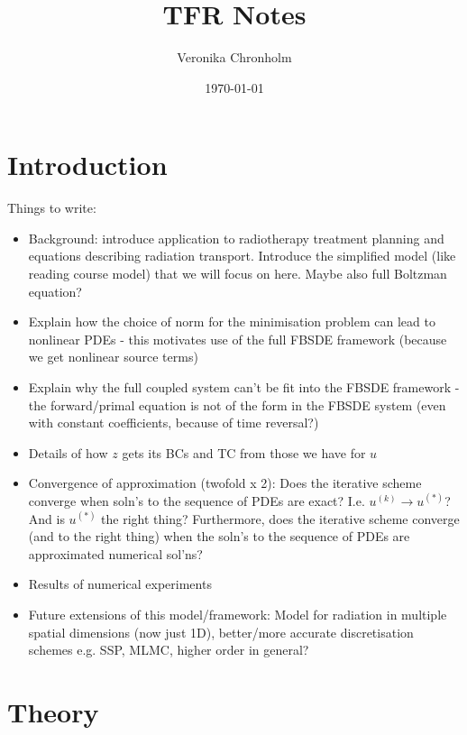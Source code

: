 \documentclass{article}  %
\title{TFR Notes}
\author{Veronika Chronholm}
\date{\today}
\begin{document}
\maketitle

\section{Introduction}
Things to write:
\begin{itemize}
    \item Background: introduce application to radiotherapy treatment planning and equations describing radiation transport. Introduce the simplified model (like reading course model) that we will focus on here. Maybe also full Boltzman equation?
    \item Explain how the choice of norm for the minimisation problem can lead to nonlinear PDEs - this motivates use of the full FBSDE framework (because we get nonlinear source terms)
    \item Explain why the full coupled system can't be fit into the FBSDE framework - the forward/primal equation is not of the form in the FBSDE system (even with constant coefficients, because of time reversal?)
    \item Details of how $z$ gets its BCs and TC from those we have for $u$
    \item Convergence of approximation (twofold x 2): Does the iterative scheme converge when soln's to the sequence of PDEs are exact? I.e. $u^{(k)} \rightarrow u^{(*)}$? And is $u^{(*)}$ the right thing? Furthermore, does the iterative scheme converge (and to the right thing) when the soln's to the sequence of PDEs are approximated numerical sol'ns?
    \item Results of numerical experiments
    \item Future extensions of this model/framework: Model for radiation in multiple spatial dimensions (now just 1D), better/more accurate discretisation schemes e.g. SSP, MLMC, higher order in general?
\end{itemize}

\section{Theory}



\end{document}
